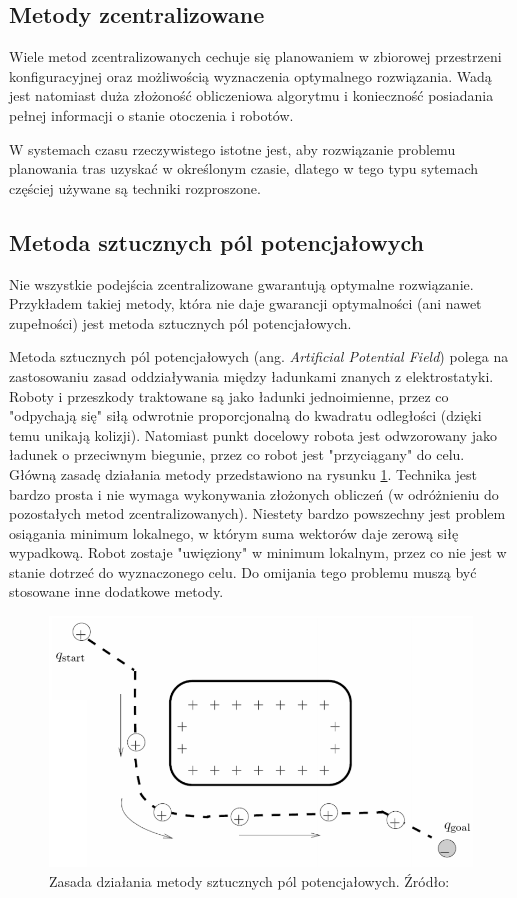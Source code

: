 \subsection{Metody zcentralizowane}
Wiele metod zcentralizowanych cechuje się planowaniem w zbiorowej przestrzeni konfiguracyjnej oraz możliwością wyznaczenia optymalnego rozwiązania.
Wadą jest natomiast duża złożoność obliczeniowa algorytmu i konieczność posiadania pełnej informacji o stanie otoczenia i robotów.

W systemach czasu rzeczywistego istotne jest, aby rozwiązanie problemu planowania tras uzyskać w określonym czasie, dlatego w tego typu sytemach częściej używane są techniki rozproszone.

\subsection{Metoda sztucznych pól potencjałowych}
Nie wszystkie podejścia zcentralizowane gwarantują optymalne rozwiązanie. Przykładem takiej metody, która nie daje gwarancji optymalności (ani nawet zupełności) jest metoda sztucznych pól potencjałowych.

Metoda sztucznych pól potencjałowych (ang. {\it Artificial Potential Field}) polega na zastosowaniu zasad oddziaływania między ładunkami znanych z elektrostatyki. Roboty i przeszkody traktowane są jako ładunki jednoimienne, przez co "odpychają się" siłą odwrotnie proporcjonalną do kwadratu odległości (dzięki temu unikają kolizji). Natomiast punkt docelowy robota jest odwzorowany jako ładunek o przeciwnym biegunie, przez co robot jest "przyciągany" do celu.
Główną zasadę działania metody przedstawiono na rysunku \ref{fig:image_potentialfield}.
Technika jest bardzo prosta i nie wymaga wykonywania złożonych obliczeń (w odróżnieniu do pozostałych metod zcentralizowanych). Niestety bardzo powszechny jest problem osiągania minimum lokalnego, w którym suma wektorów daje zerową siłę wypadkową. Robot zostaje "uwięziony" w minimum lokalnym, przez co nie jest w stanie dotrzeć do wyznaczonego celu. Do omijania tego problemu muszą być stosowane inne dodatkowe metody. \cite{potentialfield}
\begin{figure}[H]
	\centering
	\includegraphics[width=12cm]{img/potential-field}
	\caption{Zasada działania metody sztucznych pól potencjałowych. Źródło: \cite{howie_potentialfield}}
	\label{fig:image_potentialfield}
\end{figure}

